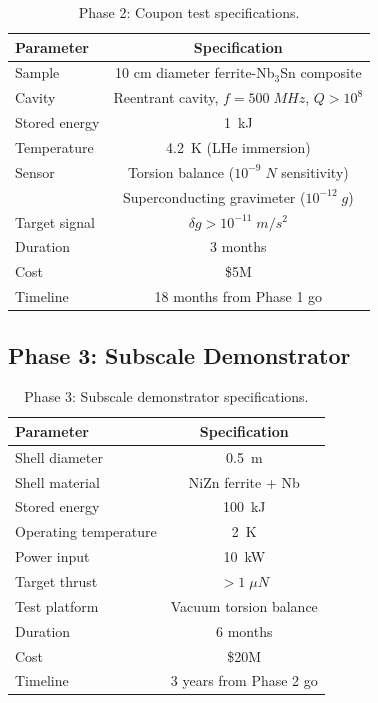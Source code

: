 \documentclass[twocolumn,prl,superscriptaddress,nofootinbib,longbibliography,floatfix]{revtex4-2}
\begin{document}
\begin{table}[h]
\centering
\caption{Phase 2: Coupon test specifications.}
\label{tab:phase2}
\begin{ruledtabular}
\begin{tabular}{lc}
Parameter & Specification \\
\hline
Sample & 10 cm diameter ferrite-Nb$_3$Sn composite \\
Cavity & Reentrant cavity, $f = 500\;\si{MHz}$, $Q > 10^8$ \\
Stored energy & 1~kJ \\
Temperature & 4.2~K (LHe immersion) \\
Sensor & Torsion balance ($10^{-9}\;\si{N}$ sensitivity) \\
 & Superconducting gravimeter ($10^{-12}\;g$) \\
Target signal & $\delta g > 10^{-11}\;\si{m/s^2}$ \\
Duration & 3 months \\
Cost & \$5M \\
Timeline & 18 months from Phase 1 go \\
\end{tabular}
\end{ruledtabular}
\end{table}

\subsection{Phase 3: Subscale Demonstrator}

\begin{table}[h]
\centering
\caption{Phase 3: Subscale demonstrator specifications.}
\label{tab:phase3}
\begin{ruledtabular}
\begin{tabular}{lc}
Parameter & Specification \\
\hline
Shell diameter & 0.5~m \\
Shell material & NiZn ferrite + Nb \\
Stored energy & 100~kJ \\
Operating temperature & 2~K \\
Power input & 10~kW \\
Target thrust & $> 1\;\mu\si{N}$ \\
Test platform & Vacuum torsion balance \\
Duration & 6 months \\
Cost & \$20M \\
Timeline & 3 years from Phase 2 go \\
\end{tabular}
\end{ruledtabular}
\end{table}
\end{document}
